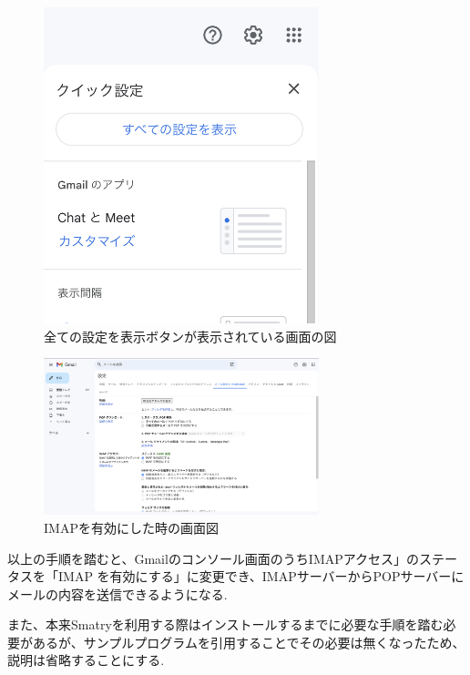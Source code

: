 \documentclass[submit,techrep]{ipsj}
\begin{document}
   \begin{figure}[htbp]
  \centering
 \includegraphics[width=8cm]{./images/all_setting.jpg}
  \caption{全ての設定を表示ボタンが表示されている画面の図}
  \label{fig:sample}
\end{figure}
  
  \begin{figure}[htbp]
  \centering
 \includegraphics[width=8cm]{./images/pop_imap.jpg}
  \caption{IMAPを有効にした時の画面図}
  \label{fig:sample}
\end{figure}

以上の手順を踏むと、Gmailのコンソール画面のうちIMAPアクセス」のステータスを「IMAP を有効にする」に変更でき、IMAPサーバーからPOPサーバーにメールの内容を送信できるようになる.

また、本来Smatryを利用する際はインストールするまでに必要な手順を踏む必要があるが、サンプルプログラムを引用することでその必要は無くなったため、説明は省略することにする.
\end{document}
